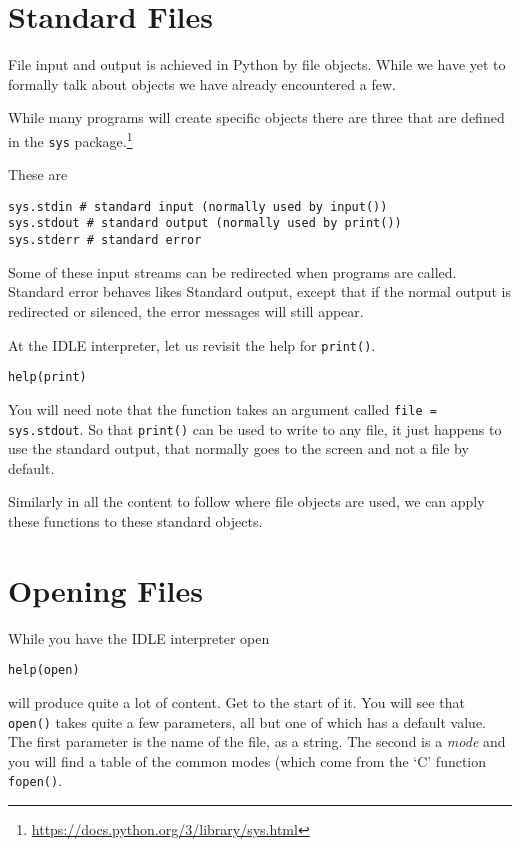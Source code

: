 \documentclass[12pt,oneside]{cttutorial}
\begin{document}
\section{Standard Files}

File input and output is achieved in Python by file objects. While we have yet to formally talk about objects we have already encountered a few.

While many programs will create specific objects there are three that are defined in the \lstinline!sys! package.\footnote{
\url{https://docs.python.org/3/library/sys.html}
}

These are

\begin{lstlisting}
sys.stdin # standard input (normally used by input())
sys.stdout # standard output (normally used by print())
sys.stderr # standard error
\end{lstlisting}

Some of these input streams can be redirected when programs are called. Standard error behaves likes Standard output, except that if the normal output is redirected or silenced, the error messages will still appear.

At the IDLE interpreter, let us revisit the help for \lstinline!print()!.

\begin{lstlisting}
help(print)
\end{lstlisting}

You will need note that the function takes an argument called \lstinline!file = sys.stdout!. So that \lstinline!print()! can be used to write to any file, it just happens to use the standard output, that normally goes to the screen and not a file by default.

Similarly in all the content to follow where file objects are used, we can apply these functions to these standard objects.

\section{Opening Files}

While you have the IDLE interpreter open

\begin{lstlisting}
help(open)
\end{lstlisting}

will produce quite a lot of content. Get to the start of it. You will see that \lstinline!open()! takes quite a few parameters, all but one of which has a default value. The first parameter is the name of the file, as a string. The second is a \emph{mode} and you will find a table of the common modes (which come from the `C' function \lstinline!fopen()!.
\end{document}
